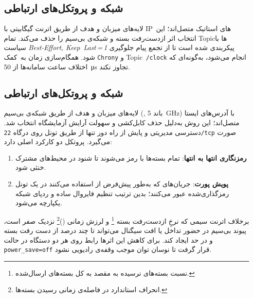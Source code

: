 	\subsection{شبکه و پروتکل‌های ارتباطی}
	لایه‌های میزبان و هدف از طریق اترنت گیگابیتی با IP های استاتیک متصل‌اند؛ این انتخاب اثر از‌دست‌رفت بسته و  شبکه‌ی بی‌سیم را حذف می‌کند. تمام Topicها با سیاست \textit{Best‑Effort, Keep Last = 1} پیکربندی شده است تا از تجمع پیام جلوگیری شود. همگام‌سازی زمان به کمک \texttt{Chrony} و Topic \texttt{/clock} انجام می‌شود، به‌گونه‌ای که اختلاف ساعت سامانه‌ها از \SI{50}{\micro\second} تجاوز نکند.
	
	
\subsection{شبکه و پروتکل‌های ارتباطی}\label{subsec:hil_network}

لایه‌های میزبان و هدف از طریق شبکه‌ی بی‌سیم
  {(, باند \SI{5}{\giga\hertz})} 
 با آدرس‌های  ایستا متصل‌اند؛ این روش به‌دلیل حذف کابل‌کشی و سهولت آرایش آزمایشگاه انتخاب شد. دسترسی مدیریتی و پایش از راه دور تنها از طریق تونل  روی درگاه \texttt{22/tcp} صورت می‌گیرد. پروتکل  دو کارکرد اصلی دارد:

\begin{enumerate}
	\item \textbf{رمزنگاری انتها به انتها}: 
	تمام بسته‌ها با  رمز می‌شوند تا شنود در محیط‌های مشترک 
	خنثی شود.
	\item \textbf{پویش پورت}: جریان‌های  که به‌طور پیش‌فرض از  استفاده می‌کنند در یک تونل 
	 رمزگذاری‌شده عبور می‌کنند؛ بدین ترتیب تنظیم فایروال ساده و ردپای
	 شبکه یکپارچه می‌شود.
\end{enumerate}

برخلاف اترنت سیمی که نرخِ ازدست‌رفت بسته \footnote{نسبت بسته‌های نرسیده به مقصد به کل بسته‌های ارسال‌شده.} و لرزش زمانی ()\footnote{انحراف استاندارد در فاصله‌ی زمانی رسیدن بسته‌ها.} نزدیک صفر است، پیوند بی‌سیم در حضور تداخل یا افت سیگنال می‌تواند تا چند درصد از دست رفت بسته و  در حد
ایجاد کند. برای کاهش این اثرها 
	 رابط  روی هر دو دستگاه در حالت \texttt{power\_save=off} قرار گرفت تا نوسان توان موجب وقفه‌ی رادیویی نشود.

